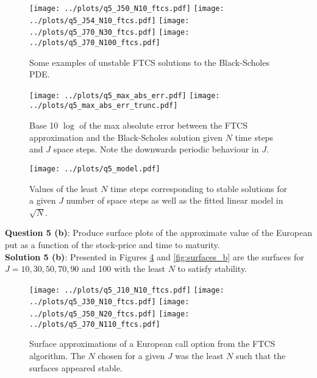 \documentclass[12pt]{article}
\begin{document}
\begin{figure}[H]
	\centering
 	\texttt{[image: ../plots/q5\_J50\_N10\_ftcs.pdf]}
 	\texttt{[image: ../plots/q5\_J54\_N10\_ftcs.pdf]}
    	\texttt{[image: ../plots/q5\_J70\_N30\_ftcs.pdf]}
    	\texttt{[image: ../plots/q5\_J70\_N100\_ftcs.pdf]}
\caption{Some examples of unstable FTCS solutions to the Black-Scholes PDE.}
\label{fig:unstable}
\end{figure}

\begin{figure}[H]
	\centering
 	\texttt{[image: ../plots/q5\_max\_abs\_err.pdf]}
 	\texttt{[image: ../plots/q5\_max\_abs\_err\_trunc.pdf]}
\caption{Base 10 $\log$ of the max absolute error between the FTCS approximation and the Black-Scholes solution given $N$ time steps and $J$ space steps. Note the downwards periodic behaviour in $J$.}
\label{fig:max_abs_err}
\end{figure}

\begin{figure}[H]
	\centering
 	\texttt{[image: ../plots/q5\_model.pdf]}
\caption{Values of the least $N$ time steps corresponding to stable solutions for a given $J$ number of space steps as well as the fitted linear model in $\sqrt{N}$.}
\label{fig:model}
\end{figure}



\newpage
{\bf Question 5 (b)}: Produce surface plots of the approximate value of the European put as a function of the stock-price and time to maturity. \\

{\bf Solution 5 (b)}: Presented in Figures \ref{fig:surfaces_a} and \ref{fig:surfaces_b} are the surfaces for $J = 10, 30, 50, 70, 90$ and 100 with the least $N$ to satisfy stability.

\begin{figure}[H]
	\centering
 	\texttt{[image: ../plots/q5\_J10\_N10\_ftcs.pdf]}
	\texttt{[image: ../plots/q5\_J30\_N10\_ftcs.pdf]}
	\texttt{[image: ../plots/q5\_J50\_N20\_ftcs.pdf]}
	\texttt{[image: ../plots/q5\_J70\_N110\_ftcs.pdf]}
\caption{Surface approximations of a European call option from the FTCS algorithm. The $N$ chosen for a given $J$ was the least $N$ such that the surfaces appeared stable.}
\label{fig:surfaces_a}
\end{figure}
\end{document}

